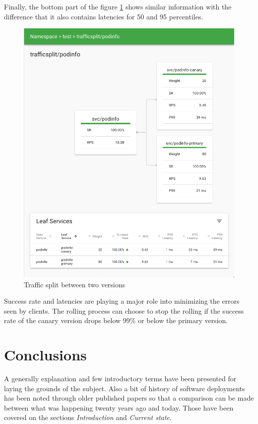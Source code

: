 \documentclass[conference]{IEEEtran}
\begin{document}
    Finally, the bottom part of the figure \ref{fig:canary} shows similar information with the difference that it also contains latencies for 50 and 95 percentiles.

    \begin{figure}
        \centering
        \includegraphics[scale=0.25]{canary.png}
        \caption{Traffic split between two versions}
        \label{fig:canary}
    \end{figure}

    Success rate and latencies are playing a major role into minimizing the errors seen by clients. The rolling process can choose to stop the rolling if the success rate of the canary version drops below 99\% or below the primary version.

\section{Conclusions}

    A generally explanation and few introductory terms have been presented for laying the grounds of the subject. Also a bit of history of software deployments has been noted through older published papers so that a comparison can be made between what was happening twenty years ago and today. Those have been covered on the sections \textit{Introduction} and \textit{Current state}.
    
\end{document}
